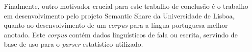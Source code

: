 Finalmente, outro motivador crucial para este trabalho de conclusão é o trabalho em desenvolvimento pelo projeto Semantic Share da Universidade de Lisboa, quanto ao desenvolvimento de um \emph{corpus} para a língua portuguesa melhor anotado. Este \emph{corpus} contém dados linguísticos de fala ou escrita, servindo de base de uso para o \emph{parser} estatístico utilizado.




